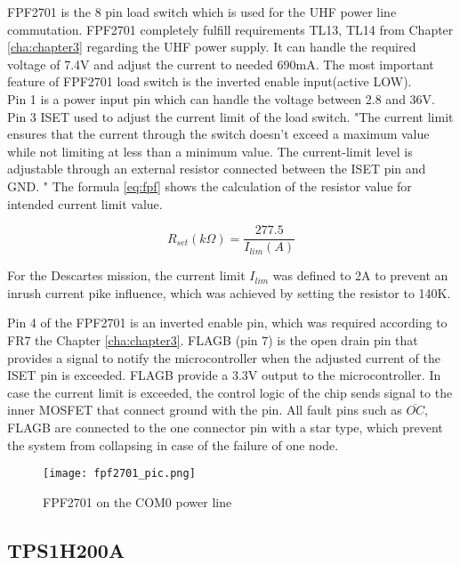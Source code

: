 FPF2701 is the 8 pin load switch which is used for the UHF power line commutation. FPF2701 completely fulfill requirements TL13, TL14 from Chapter \ref{cha:chapter3} regarding the UHF power supply. It can handle the required voltage of 7.4V and adjust the current to needed 690mA. The most important feature of FPF2701 load switch is the inverted enable input(active LOW).\\

Pin 1 is a power input pin which can handle the voltage between 2.8 and 36V. Pin 3 ISET used to adjust the current limit of the load switch. \cite{27} "The  current  limit  ensures  that  the  current  through  the switch  doesn't  exceed  a  maximum  value  while  not limiting  at  less  than  a  minimum  value.  The current-limit level    is    adjustable    through    an    external    resistor connected between the ISET pin and GND. " The formula \ref{eq:fpf} shows the calculation of the resistor value for intended current limit value.

\begin{equation}\label{eq:fpf}
R_{set}(k\Omega) = \frac{277.5}{I_{lim}(A)}
\end{equation}

For the Descartes mission, the current limit $I_{lim}$ was defined to 2A to prevent an inrush current pike influence, which was achieved by setting the resistor to 140K.

Pin 4 of the FPF2701 is an inverted enable pin, which was required according to FR7 the Chapter \ref{cha:chapter3}. FLAGB (pin 7) is the open drain pin that provides a signal to notify the microcontroller when the adjusted current of the ISET pin is exceeded. FLAGB provide a 3.3V output to the microcontroller. In case the current limit is exceeded, the control logic of the chip sends signal to the inner MOSFET that connect ground with the pin. All fault pins such as $\overline{OC}$, FLAGB  are connected to the one connector pin with a star type, which prevent the system from collapsing in case of the failure of one node.

\begin{figure}[h]
	\centering
	\texttt{[image: fpf2701\_pic.png]}
	\caption{FPF2701 on the COM0 power line}
	\label{fig: fpf27_schema}
\end{figure} 

\subsection{TPS1H200A}

